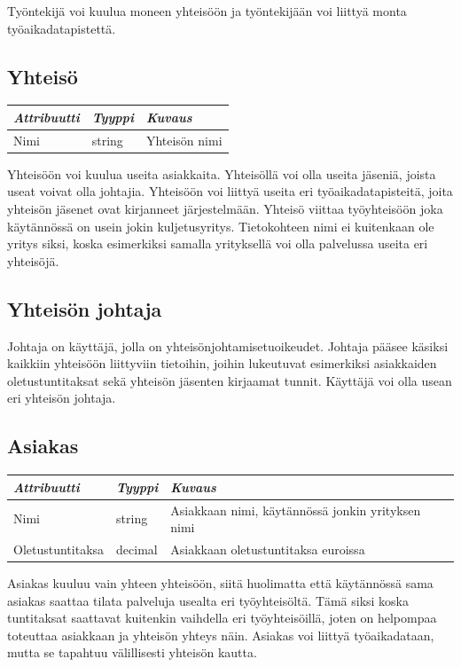 \documentclass[a4paper, 12pt finnish]{article}
\begin{document}
Työntekijä voi kuulua moneen yhteisöön ja työntekijään voi liittyä
monta työaikadatapistettä.

\subsection{Yhteisö}
\begin{center}
\begin{tabular}{| l | l | l |}
    \hline
    \emph{Attribuutti} & \emph{Tyyppi} & \emph{Kuvaus} \\ \hline
    Nimi & string & Yhteisön nimi \\ \hline
\end{tabular}
\end{center}

Yhteisöön voi kuulua useita asiakkaita. Yhteisöllä voi olla useita
jäseniä, joista useat voivat olla johtajia. Yhteisöön voi liittyä
useita eri työaikadatapisteitä, joita yhteisön jäsenet ovat kirjanneet
järjestelmään. Yhteisö viittaa työyhteisöön joka käytännössä on usein
jokin kuljetusyritys. Tietokohteen nimi ei kuitenkaan ole yritys siksi,
koska esimerkiksi samalla yrityksellä voi olla palvelussa useita eri 
yhteisöjä.

\subsection{Yhteisön johtaja}
Johtaja on käyttäjä, jolla on yhteisönjohtamisetuoikeudet. Johtaja pääsee
käsiksi kaikkiin yhteisöön liittyviin tietoihin, joihin lukeutuvat
esimerkiksi asiakkaiden oletustuntitaksat sekä yhteisön jäsenten 
kirjaamat tunnit. Käyttäjä voi olla usean eri yhteisön johtaja.

\subsection{Asiakas}
\begin{center}
\begin{tabular}{| l | l | l |}
    \hline
    \emph{Attribuutti} & \emph{Tyyppi} & \emph{Kuvaus} \\ \hline
    Nimi & string & Asiakkaan nimi, käytännössä jonkin yrityksen nimi \\
    \hline
    Oletustuntitaksa & decimal & Asiakkaan oletustuntitaksa euroissa \\
    \hline
\end{tabular}
\end{center}

Asiakas kuuluu vain yhteen yhteisöön, siitä huolimatta että käytännössä
sama asiakas saattaa tilata palveluja usealta eri työyhteisöltä. Tämä
siksi koska tuntitaksat saattavat kuitenkin vaihdella eri työyhteisöillä,
joten on helpompaa toteuttaa asiakkaan ja yhteisön yhteys näin. 
Asiakas voi liittyä työaikadataan, mutta se tapahtuu välillisesti
yhteisön kautta.
\end{document}
